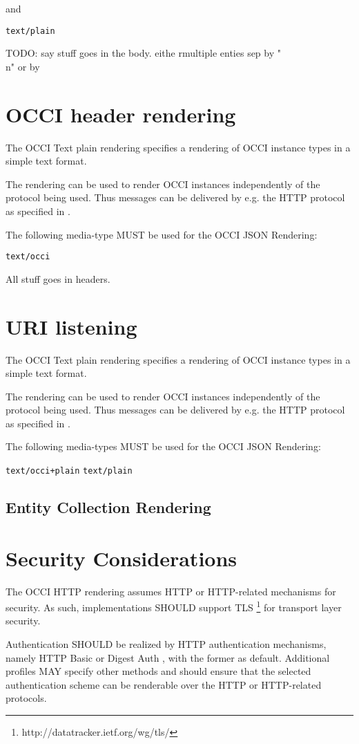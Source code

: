 \documentclass[10pt,a4paper]{article}
\begin{document}
and

	{\tt text/plain}

TODO: say stuff goes in the body. eithe rmultiple enties sep by "\\n" or by

\section{OCCI header rendering}
The OCCI Text plain rendering specifies a rendering of OCCI instance types in a simple text format.

The rendering can be used to render OCCI instances independently of the
protocol being used. Thus messages can be delivered by e.g. the HTTP
protocol as specified in \cite{occi:protocol}.

The following media-type MUST be used for the OCCI JSON Rendering:

{\tt text/occi}

All stuff goes in headers.

\section{URI listening}
The OCCI Text plain rendering specifies a rendering of OCCI instance types in a simple text format.

The rendering can be used to render OCCI instances independently of the
protocol being used. Thus messages can be delivered by e.g. the HTTP
protocol as specified in \cite{occi:protocol}.

The following media-types MUST be used for the OCCI JSON Rendering:

{\tt text/occi+plain}
{\tt text/plain}

\subsection{Entity Collection Rendering}

\section{Security Considerations}
\label{sec:sec_consid}
The OCCI HTTP rendering assumes HTTP or HTTP-related mechanisms for
security. As such, implementations SHOULD support
TLS \footnote{http://datatracker.ietf.org/wg/tls/} for transport layer
security.

Authentication SHOULD be realized by HTTP authentication mechanisms,
namely HTTP Basic or Digest Auth \cite{rfc2617}, with the former as
default. Additional profiles MAY specify other methods and should
ensure that the selected authentication scheme can be renderable over
the HTTP or HTTP-related protocols.
\end{document}
